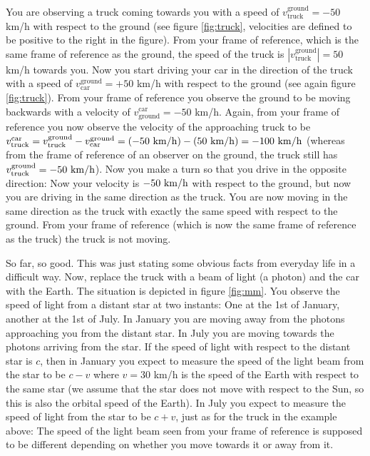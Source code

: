 {\begin{multicols}{2}
You are observing a truck coming towards you with a speed of $v_\mathrm{truck}^\mathrm{ground}=-50$ km/h with respect to the ground (see figure \ref{fig:truck}, velocities are defined to be positive to the right in the figure). From your frame of reference, which is the same frame of reference as the ground, the speed of the truck is $|v_\mathrm{truck}^\mathrm{ground}|=50$ km/h towards you. Now you start driving your car in the direction of the truck with a speed of $v_\mathrm{car}^\mathrm{ground}=+50$ km/h with respect to the ground (see again figure \ref{fig:truck}). From your frame of reference you observe the ground to be moving backwards with a velocity of $v_\mathrm{ground}^\mathrm{car}=-50$ km/h. Again, from your frame of reference you now observe the velocity of the approaching truck to be $v_\mathrm{truck}^\mathrm{car}=v_\mathrm{truck}^\mathrm{ground}-v_\mathrm{car}^\mathrm{ground}=(-50{\rm \ km/h})-(50{\rm \ km/h})=-100{\rm \ km/h}$ (whereas from the frame of reference of an observer on the ground, the truck still has $v_\mathrm{truck}^\mathrm{ground}=-50{\rm \ km/h}$). Now you make a turn so that you drive in the opposite direction: Now your velocity is $-50{\rm \ km/h}$ with respect to the ground, but now you are driving in the same direction as the truck. You are now moving in the same direction as the truck with exactly the same speed with respect to the ground. From your frame of reference (which is now the same frame of reference as the truck) the truck is not moving.

So far, so good. This was just stating some obvious facts from everyday life in a difficult way. Now, replace the truck with a beam of light (a photon) and the car with the Earth. The situation is depicted in figure \ref{fig:mm}. You observe the speed of light from a distant star at two instants: One at the 1st of January, another at the 1st of July. In January you are moving away from the photons approaching you from the distant star. In July you are moving towards the photons arriving from the star. If the speed of light with respect to the distant star is $c$, then in January you expect to measure the speed of the light beam from the star to be $c-v$ where $v=30$ km/h is the speed of the Earth with respect to the same star (we assume that the star does not move with respect to the Sun, so this is also the orbital speed of the Earth). In July you expect to measure the speed of light from the star to be $c+v$, just as for the truck in the example above: The speed of the light beam seen from your frame of reference is supposed to be different depending on whether you move towards it or away from it.


\end{multicols}}
